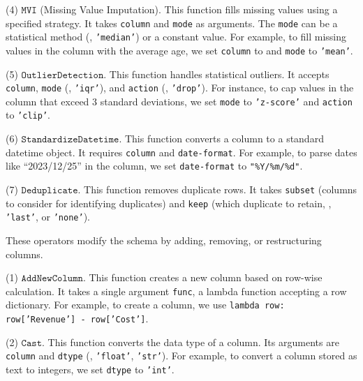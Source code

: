 (4) $\mathtt{MVI}$ (Missing Value Imputation).
    This function fills missing values using a specified strategy. It takes {\small\texttt{column}} and {\small\texttt{mode}} as arguments. The {\small\texttt{mode}} can be a statistical method (, {\small\texttt{'median'}}) or a constant value. For example, to fill missing values in the  column with the average age, we set {\small\texttt{column}} to  and {\small\texttt{mode}} to {\small\texttt{'mean'}}.

(5) $\mathtt{OutlierDetection}$.
    This function handles statistical outliers. It accepts {\small\texttt{column}}, {\small\texttt{mode}} (, {\small\texttt{'iqr'}}), and {\small\texttt{action}} (, {\small\texttt{'drop'}}). For instance, to cap values in the  column that exceed 3 standard deviations, we set {\small\texttt{mode}} to {\small\texttt{'z-score'}} and {\small\texttt{action}} to {\small\texttt{'clip'}}.

(6) $\mathtt{StandardizeDatetime}$.
    This function converts a column to a standard datetime object. It requires {\small\texttt{column}} and {\small\texttt{date-format}}. For example, to parse dates like ``2023/12/25'' in the  column, we set {\small\texttt{date-format}} to {\small\texttt{"\%Y/\%m/\%d"}}.

(7) $\mathtt{Deduplicate}$.
    This function removes duplicate rows. It takes {\small\texttt{subset}} (columns to consider for identifying duplicates) and {\small\texttt{keep}} (which duplicate to retain, , {\small\texttt{'last'}}, or {\small\texttt{'none'}}).

These operators modify the schema by adding, removing, or restructuring columns.

(1) $\mathtt{AddNewColumn}$.
    This function creates a new column based on row-wise calculation. It takes a single argument {\small\texttt{func}}, a lambda function accepting a row dictionary. For example, to create a  column, we use {\small\texttt{lambda row: row['Revenue'] - row['Cost']}}.

(2) $\mathtt{Cast}$.
    This function converts the data type of a column. Its arguments are {\small\texttt{column}} and {\small\texttt{dtype}} (, {\small\texttt{'float'}}, {\small\texttt{'str'}}). For example, to convert a  column stored as text to integers, we set {\small\texttt{dtype}} to {\small\texttt{'int'}}.

